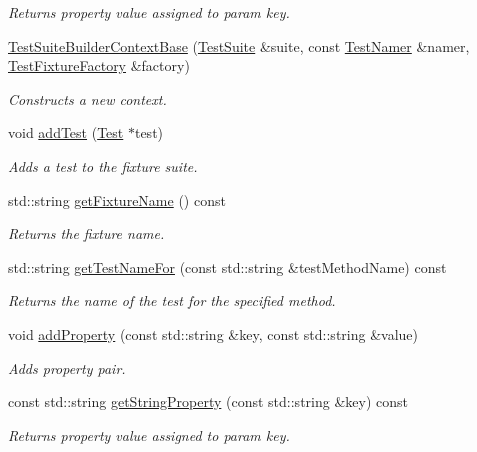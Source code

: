 \begin{DoxyCompactItemize}
\begin{DoxyCompactList}\small\item\em Returns property value assigned to param key. \end{DoxyCompactList}\item 
\hyperlink{class_test_suite_builder_context_base_a434b04354f7e326c7f88d015921d5e6d}{Test\+Suite\+Builder\+Context\+Base} (\hyperlink{class_test_suite}{Test\+Suite} \&suite, const \hyperlink{class_test_namer}{Test\+Namer} \&namer, \hyperlink{class_test_fixture_factory}{Test\+Fixture\+Factory} \&factory)
\begin{DoxyCompactList}\small\item\em Constructs a new context. \end{DoxyCompactList}\item 
void \hyperlink{class_test_suite_builder_context_base_a8b42185139e3efe07a0fe69b9549e928}{add\+Test} (\hyperlink{class_test}{Test} $\ast$test)
\begin{DoxyCompactList}\small\item\em Adds a test to the fixture suite. \end{DoxyCompactList}\item 
std\+::string \hyperlink{class_test_suite_builder_context_base_abba530361ccd63ddf23fcbdc4f33727f}{get\+Fixture\+Name} () const 
\begin{DoxyCompactList}\small\item\em Returns the fixture name. \end{DoxyCompactList}\item 
std\+::string \hyperlink{class_test_suite_builder_context_base_a137a255602edbdc2e1dc575fb53fee9e}{get\+Test\+Name\+For} (const std\+::string \&test\+Method\+Name) const 
\begin{DoxyCompactList}\small\item\em Returns the name of the test for the specified method. \end{DoxyCompactList}\item 
void \hyperlink{class_test_suite_builder_context_base_a358c75376f4d3df2ef570003cbe2e06a}{add\+Property} (const std\+::string \&key, const std\+::string \&value)
\begin{DoxyCompactList}\small\item\em Adds property pair. \end{DoxyCompactList}\item 
const std\+::string \hyperlink{class_test_suite_builder_context_base_a9955d3fda5115963ee0310d09a3b15d9}{get\+String\+Property} (const std\+::string \&key) const 
\begin{DoxyCompactList}\small\item\em Returns property value assigned to param key. \end{DoxyCompactList}\end{DoxyCompactItemize}
